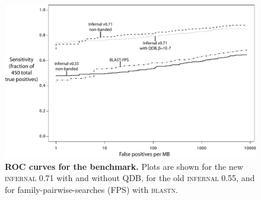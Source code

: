 \begin{figure}
\begin{center}
\includegraphics[width=6.4in,angle=0]{figs/roc}
\end{center}
\caption{\textbf{ROC curves for the benchmark.}  Plots are shown for
the new \textsc{infernal} 0.71 with and without QDB, for the old
\textsc{infernal 0.55}, and for family-pairwise-searches (FPS) with \textsc{blastn}.
}
\label{fig:roc}
\end{figure}
